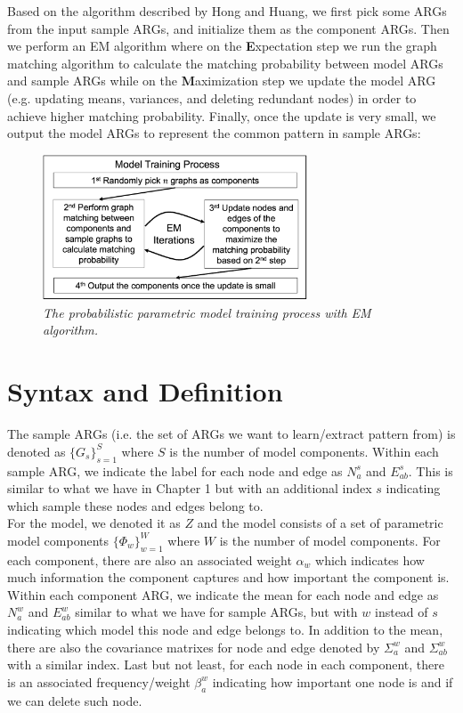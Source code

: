 Based on the algorithm described by Hong and Huang, we first pick some ARGs from the input sample ARGs, and initialize them as the component ARGs. Then we perform an EM algorithm where on the \textbf{E}xpectation step we run the graph matching algorithm to calculate the matching probability between model ARGs and sample ARGs while on the \textbf{M}aximization step we update the model ARG (e.g. updating means, variances, and deleting redundant nodes) in order to achieve higher matching probability. Finally, once the update is very small, we output the model ARGs to represent the common pattern in sample ARGs:

\begin{figure}[h]
	\centering
	\captionsetup{justification=centering}
	\includegraphics[width=0.7\textwidth]{figs/model_training.png}
	\caption[Caption for LOF]{\emph{The probabilistic parametric model training process with EM algorithm.}}
	\label{fig:model_training}
\end{figure}

\section{Syntax and Definition}

The sample ARGs (i.e. the set of ARGs we want to learn/extract pattern from) is denoted as $\{G_s\}_{s=1}^S$ where $S$ is the number of model components. Within each sample ARG, we indicate the label for each node and edge as $N^s_a$ and $E^s_{ab}$. This is similar to what we have in Chapter 1 but with an additional index $s$ indicating which sample these nodes and edges belong to.\\

For the model, we denoted it as $Z$ and the model consists of a set of parametric model components $\{\Phi_w\}_{w=1}^W$ where $W$ is the number of model components. For each component, there are also an associated weight $\alpha_w$ which indicates how much information the component captures and how important the component is.\\

Within each component ARG, we indicate the mean for each node and edge as $N^w_a$ and $E^w_{ab}$ similar to what we have for sample ARGs, but with $w$ instead of $s$ indicating which model this node and edge belongs to. In addition to the mean, there are also the covariance matrixes for node and edge denoted by $\Sigma^w_a$ and $\Sigma^w_{ab}$ with a similar index. Last but not least, for each node in each component, there is an associated frequency/weight $\beta^w_a$ indicating how important one node is and if we can delete such node.\\